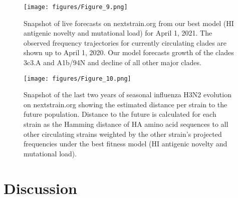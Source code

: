 \documentclass[9pt,lineno]{elife} %
\providecommand{\DIFaddbeginFL}{} %
\providecommand{\DIFaddendFL}{} %
\providecommand{\DIFdelbeginFL}{} %
\providecommand{\DIFdelendFL}{} %
\providecommand{\DIFaddbeginFL}{} %
\providecommand{\DIFaddendFL}{} %
\providecommand{\DIFdelbeginFL}{} %
\providecommand{\DIFdelendFL}{} %
\newcommand{\DIFscaledelfig}{0.5}
\newlength{\DIFdelgraphicswidth} %
\newlength{\DIFdelgraphicsheight} %
\newcommand{\DIFaddincludegraphics}[2][]{{\color{blue}\fbox{\DIFOincludegraphics[#1]{#2}}}} %
\newcommand{\DIFdelincludegraphics}[2][]{%
\sbox{\DIFdelgraphicsbox}{\DIFOincludegraphics[#1]{#2}}%
\settoboxwidth{\DIFdelgraphicswidth}{\DIFdelgraphicsbox} %
\settoboxtotalheight{\DIFdelgraphicsheight}{\DIFdelgraphicsbox} %
\scalebox{\DIFscaledelfig}{%
\parbox[b]{\DIFdelgraphicswidth}{\usebox{\DIFdelgraphicsbox}\\[-\baselineskip] \rule{\DIFdelgraphicswidth}{0em}}\llap{\resizebox{\DIFdelgraphicswidth}{\DIFdelgraphicsheight}{%
\setlength{\unitlength}{\DIFdelgraphicswidth}%
\begin{picture}(1,1)%
\thicklines\linethickness{2pt} %
{\color[rgb]{1,0,0}\put(0,0){\framebox(1,1){}}}%
{\color[rgb]{1,0,0}\put(0,0){\line( 1,1){1}}}%
{\color[rgb]{1,0,0}\put(0,1){\line(1,-1){1}}}%
\end{picture}%
}\hspace*{3pt}}} %
} %
\DeclareRobustCommand{\DIFaddbeginFL}{\DIFOaddbeginFL \let\includegraphics\DIFaddincludegraphics} %
\DeclareRobustCommand{\DIFaddendFL}{\DIFOaddendFL \let\includegraphics\DIFOincludegraphics} %
\DeclareRobustCommand{\DIFdelbeginFL}{\DIFOdelbeginFL \let\includegraphics\DIFdelincludegraphics} %
\DeclareRobustCommand{\DIFdelendFL}{\DIFOaddendFL \let\includegraphics\DIFOincludegraphics} %
\begin{document}
\begin{figure}[htb]
  \begin{center}
  \DIFdelbeginFL %
\DIFdelendFL \DIFaddbeginFL \texttt{[image: figures/Figure\_9.png]}
  \DIFaddendFL \caption{
    Snapshot of live forecasts on nextstrain.org from our best model (HI antigenic novelty and mutational load) for April 1, 2021.
    The observed frequency trajectories for currently circulating clades are shown up to April 1, 2020.
    Our model forecasts growth of the clades 3c3.A and A1b/94N and decline of all other major clades.
  }
  \label{fig:nextstrain_forecasts}
  \end{center}
\end{figure}

\begin{figure}[htb]
  \begin{center}
  \DIFdelbeginFL %
\DIFdelendFL \DIFaddbeginFL \texttt{[image: figures/Figure\_10.png]}
  \DIFaddendFL \caption{
    Snapshot of the last two years of seasonal influenza H3N2 evolution on nextstrain.org showing the estimated distance per strain to the future population.
    Distance to the future is calculated for each strain as the Hamming distance of HA amino acid sequences to all other circulating strains weighted by the other strain's projected frequencies under the best fitness model (HI antigenic novelty and mutational load).
  }
  \label{fig:nextstrain_distance_to_future}
  \end{center}
\end{figure}

\section*{Discussion}
\end{document}
